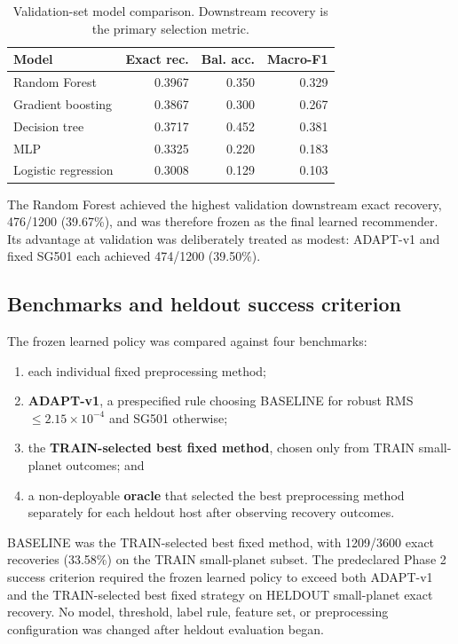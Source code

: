 \documentclass[10pt,twocolumn]{article}
\begin{document}
\begin{table}[t]
\centering
\caption{Validation-set model comparison. Downstream recovery is the primary selection metric.}
\label{tab:validation}
\begin{tabular}{lrrr}
\toprule
Model & Exact rec. & Bal. acc. & Macro-F1 \\
\midrule
Random Forest & 0.3967 & 0.350 & 0.329 \\
Gradient boosting & 0.3867 & 0.300 & 0.267 \\
Decision tree & 0.3717 & 0.452 & 0.381 \\
MLP & 0.3325 & 0.220 & 0.183 \\
Logistic regression & 0.3008 & 0.129 & 0.103 \\
\bottomrule
\end{tabular}
\end{table}

The Random Forest achieved the highest validation downstream exact recovery, 476/1200 (39.67\%), and was therefore frozen as the final learned recommender. Its advantage at validation was deliberately treated as modest: ADAPT-v1 and fixed SG501 each achieved 474/1200 (39.50\%).

\subsection{Benchmarks and heldout success criterion}

The frozen learned policy was compared against four benchmarks:

\begin{enumerate}[leftmargin=1.2em,itemsep=1pt]
    \item each individual fixed preprocessing method;
    \item \textbf{ADAPT-v1}, a prespecified rule choosing BASELINE for robust RMS $\leq 2.15\times10^{-4}$ and SG501 otherwise;
    \item the \textbf{TRAIN-selected best fixed method}, chosen only from TRAIN small-planet outcomes; and
    \item a non-deployable \textbf{oracle} that selected the best preprocessing method separately for each heldout host after observing recovery outcomes.
\end{enumerate}

BASELINE was the TRAIN-selected best fixed method, with 1209/3600 exact recoveries (33.58\%) on the TRAIN small-planet subset. The predeclared Phase 2 success criterion required the frozen learned policy to exceed both ADAPT-v1 and the TRAIN-selected best fixed strategy on HELDOUT small-planet exact recovery. No model, threshold, label rule, feature set, or preprocessing configuration was changed after heldout evaluation began.
\end{document}
